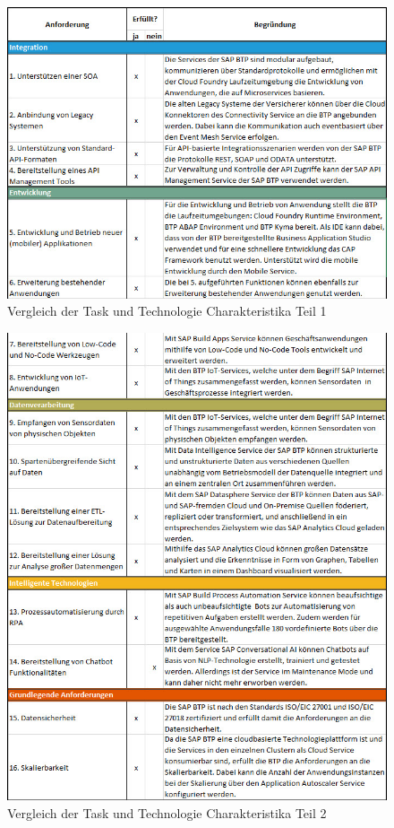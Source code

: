 \begin{figure}[ht]
    \centering
    \includegraphics[width=1\textwidth]{img/TTFTeil1S.jpg}
    \caption[Vergleich der Task und Technologie Charakteristika Teil 1]{Vergleich der Task und Technologie Charakteristika Teil 1\autocite{TFTeil1}}
    \label{fig:TTFTeil1}
\end{figure}

\FloatBarrier

\begin{figure}[ht]
    \centering
    \includegraphics[width=1\textwidth]{img/TTFTeil2S.jpg}
    \caption[Vergleich der Task und Technologie Charakteristika Teil 2]{Vergleich der Task und Technologie Charakteristika Teil 2\autocite{TFTeil2}}
    \label{fig:TTFTeil2}
\end{figure}

